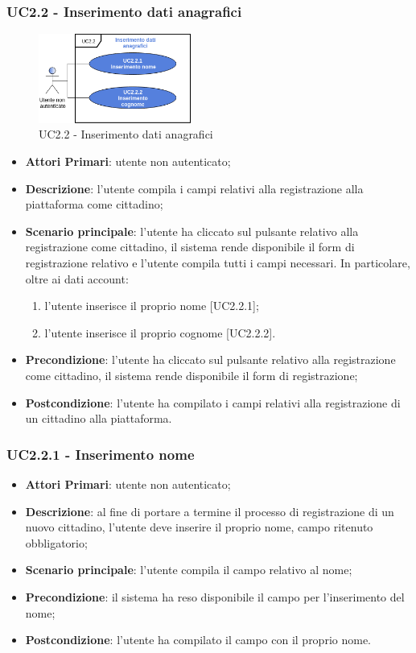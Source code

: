\subsubsection{UC2.2 - Inserimento dati anagrafici}
\begin{figure}[h]
	\includegraphics[width=5cm]{res/images/UC2-2RegistrazioneGenerale.png}
	\centering
	\caption{UC2.2 - Inserimento dati anagrafici}
\end{figure}
\begin{itemize}
	\item \textbf{Attori Primari}: utente non autenticato;
	\item \textbf{Descrizione}: l'utente compila i campi relativi alla registrazione alla piattaforma come cittadino;
	\item \textbf{Scenario principale}: l'utente ha cliccato sul pulsante relativo alla registrazione come cittadino, il sistema rende disponibile il form di registrazione relativo e l'utente compila tutti i campi necessari. In particolare, oltre ai dati account:
	\begin{enumerate}[label=\alph*.]
		\item l'utente inserisce il proprio nome [UC2.2.1];
		\item l'utente inserisce il proprio cognome [UC2.2.2].
	\end{enumerate}
	\item \textbf{Precondizione}: l'utente ha cliccato sul pulsante relativo alla registrazione come cittadino, il sistema rende disponibile il form di registrazione;
	\item \textbf{Postcondizione}: l'utente ha compilato i campi relativi alla registrazione di un cittadino alla piattaforma.
\end{itemize}
\subsubsection{UC2.2.1 - Inserimento nome}
\begin{itemize}
	\item \textbf{Attori Primari}: utente non autenticato;
	\item \textbf{Descrizione}: al fine di portare a termine il processo di registrazione di un nuovo cittadino, l'utente deve inserire il proprio nome, campo ritenuto obbligatorio;
	\item \textbf{Scenario principale}: l'utente compila il campo relativo al nome;
	\item \textbf{Precondizione}: il sistema ha reso disponibile il campo per l'inserimento del nome;
	\item \textbf{Postcondizione}: l'utente ha compilato il campo con il proprio nome.
\end{itemize}
